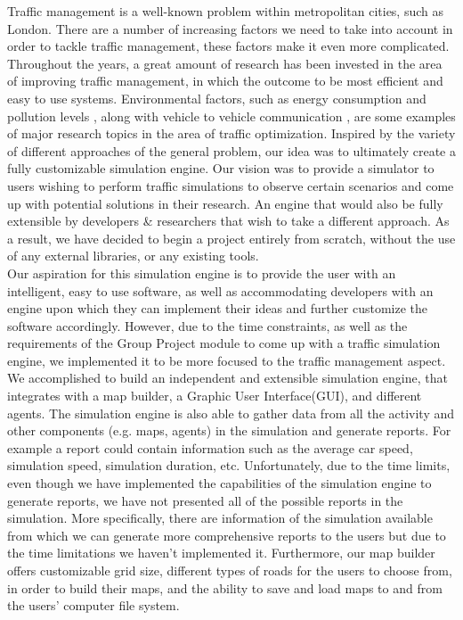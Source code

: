 \documentclass[oneside]{article}
\begin{document}
Traffic management is a well-known problem within metropolitan cities, such as London. There are a number of increasing factors we need to take into account in order to tackle traffic management, these factors make it even more complicated. Throughout the years, a great amount of research has been invested in the area of improving traffic management, in which the outcome to be most efficient and easy to use systems. Environmental factors, such as energy consumption \cite{macneille2013integration, 5973655, osorio2013energy} and pollution levels \cite{panis2006modelling}, along with vehicle to vehicle communication \cite{conceiccao2008large}, are some examples of major research topics in the area of traffic optimization. Inspired by the variety of different approaches of the general problem, our idea was to ultimately create a fully customizable simulation engine. Our vision was to provide a simulator to users wishing to perform traffic simulations to observe certain scenarios and come up with potential solutions in their research. An engine that would also be fully extensible by developers \& researchers that wish to take a different approach. As a result, we have decided to begin a project entirely from scratch, without the use of any external libraries, or any existing tools.\\
\newline
\noindent Our aspiration for this simulation engine is to provide the user with an intelligent, easy to use software, as well as accommodating developers with an engine upon which they can implement their ideas and further customize the software accordingly. However, due to the time constraints, as well as the requirements of the Group Project module to come up with a traffic simulation engine, we implemented it to be more focused to the traffic management aspect. We accomplished to build an independent and extensible simulation engine, that integrates with a map builder, a Graphic User Interface(GUI), and different agents. The simulation engine is also able to gather data from all the activity and other components (e.g. maps, agents) in the simulation and generate reports. For example a report could contain information such as the average car speed, simulation speed, simulation duration, etc. Unfortunately, due to the time limits, even though we have implemented the capabilities of the simulation engine to generate reports, we have not presented all of the possible reports in the simulation. More specifically, there are information of the simulation available from which we can generate more comprehensive reports to the users but due to the time limitations we haven't implemented it. Furthermore, our map builder offers customizable grid size, different types of roads for the users to choose from, in order to build their maps, and the ability to save and load maps to and from the users' computer file system. 
\newline
\end{document}
